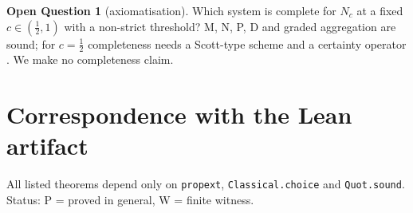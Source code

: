 \documentclass[11pt,a4paper]{article}
\theoremstyle{definition}
\newtheorem{question}[theorem]{Open Question}
\theoremstyle{remark}
\newcommand{\lean}[1]{\texttt{\small #1}}
\begin{document}
\begin{question}[axiomatisation]
Which system is complete for $N_c$ at a fixed $c\in(\tfrac12,1)$ with a non-strict
threshold? M, N, P, D and graded aggregation are sound; for $c=\tfrac12$ completeness
needs a Scott-type scheme and a certainty operator \cite{vER2014}. We make no
completeness claim.
\end{question}

\appendix
\section{Correspondence with the Lean artifact}

All listed theorems depend only on \lean{propext}, \lean{Classical.choice} and
\lean{Quot.sound}. Status: P = proved in general, W = finite witness.
\end{document}
